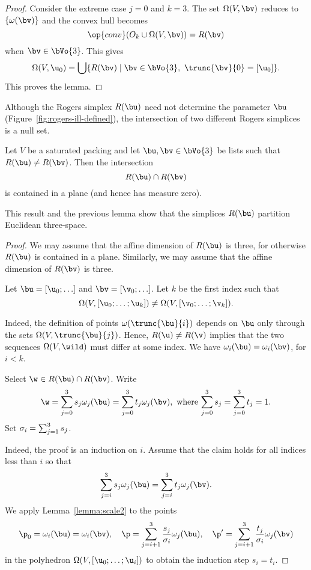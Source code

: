 \begin{cnl}
\begin{proof}
Consider the extreme case $j=0$ and $k=3$.  The set $\Omega(V,\bv)$
reduces to $\braced{\omega(\bv)}$ and the convex hull becomes
\[  
\op{conv}(O_{k}\cup \Omega(V,\bv)) = R(\bv)
\] 
when $\bv\in \bVo{3}$.
This gives
\begin{equation} 
\Omega(V,\u_0) = 
\bigcup \setcomp{ R(\bv) }{ \bv\in \bVo{3},~\trunc{\bv}{0} =[\u_0]}.
\end{equation}
This proves the lemma.
\end{proof}

\figELMXAFH %

Although the Rogers simplex $R(\bu)$ need not determine the parameter
$\bu$ (Figure~\ref{fig:rogers-ill-defined}), the intersection of two
different Rogers simplices is a null set.

\begin{lemma}
\label{lemma:R-inter} 
%
Let $V$ be a saturated packing and let $\bu,\bv\in \bVo{3}$ be lists
such that $R(\bu)\ne R(\bv)$.  Then the intersection
\[  
R(\bu)\cap R(\bv)
\] 
is contained in a plane (and hence has measure zero).
\end{lemma}

This result and the previous lemma show that the simplices $R(\bu)$
partition Euclidean three-space.

\begin{proof} 
We may assume that the affine dimension of $R(\bu)$ 
is three, for otherwise $R(\bu)$ is contained in a plane.  Similarly,
we may assume that the affine dimension of $R(\bv)$ is
three.

Let $\bu = [\u_0;\ldots]$ and $\bv = [\v_0;\ldots]$.  
Let $k$ be the
first index such that
\[  
\Omega(V,\listdots{\u}{0}{k}) \ne \Omega(V,\listdots{\v}{0}{k}).
\] 

  Indeed, the definition of points
$\omega(\trunc{\bu}{i})$ depends on $\bu$ only through the sets
$\Omega(V,\trunc{\bu}{j})$.  Hence, $R(\u)\ne R(\v)$ implies that the
two sequences $\Omega(V,\wild )$ must differ at some index.
We have $\omega_i(\bu) = \omega_i(\bv)$, for $i<k$.

Select $\w\in R(\bu)\cap R(\bv)$.  Write
\[
\w = \sumupto{j}{0}{3}{s_j \omega_j(\bu)}  = \sumupto{j}{0}{3}{t_j \omega_j(\bv)},
\text{ where } \sumupto{j}{0}{3}{s_j} = \sumupto{j}{0}{3}{t_j} = 1.
\]
Set $\sigma_i = {\sum_{j = 1}^{3} {s_j}}$.

  Indeed, the
proof is an induction on $i$.  Assume that the claim holds for all
indices less than $i$ so that
\[
\sumupto{j}{i}{3}{s_j \omega_j(\bu)}  = \sumupto{j}{i}{3}{t_j \omega_j(\bv)}.
\]
We apply Lemma~\ref{lemma:scale2} to the points
\[
\p_0=\omega_i(\bu)=\omega_i(\bv),\quad
\p = \sumupto{j}{i+1}{3}{\frac{s_j}{\sigma_i} \omega_j(\bu)},\quad
\p' = \sumupto{j}{i+1}{3}{\frac{t_j}{\sigma_i} \omega_j(\bv)}
\]
in the polyhedron $\Omega(V,\listdots{\u}{0}{i})$
to obtain the induction step $s_i=t_i$.


\end{proof}
\end{cnl}

